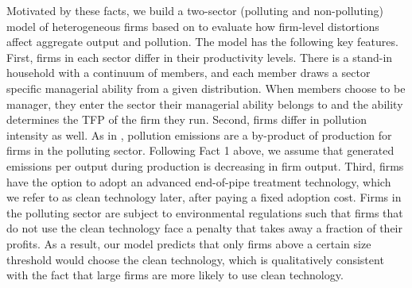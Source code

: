 \documentclass[AEJ]{AEA}
\begin{document}
Motivated by these facts, we build a two-sector (polluting and non-polluting) model of heterogeneous firms based on \citet{Lucas:1978b} to evaluate how firm-level distortions affect aggregate output and pollution. The model has the following key features. First, firms in each sector differ in their productivity levels. There is a stand-in household with a continuum of members, and each member draws a sector specific managerial ability from a given distribution. When members choose to be manager, they enter the sector their managerial ability belongs to and the ability determines the TFP of the firm they run. Second, firms differ in pollution intensity as well. As in \citet{CopelandTaylor:1994}, pollution emissions are a by-product of production for firms in the polluting sector. Following Fact 1 above, we assume that generated emissions per output during production is decreasing in firm output. %
Third, firms have the option to adopt an advanced end-of-pipe treatment technology, which we refer to as clean technology later, after paying a fixed adoption cost. Firms in the polluting sector are subject to environmental regulations such that firms that do not use the clean technology face a penalty that takes away a fraction of their profits. As a result, our model predicts that only firms above a certain size threshold would choose the clean technology, which is qualitatively consistent with the fact that large firms are more likely to use clean technology.
\end{document}
